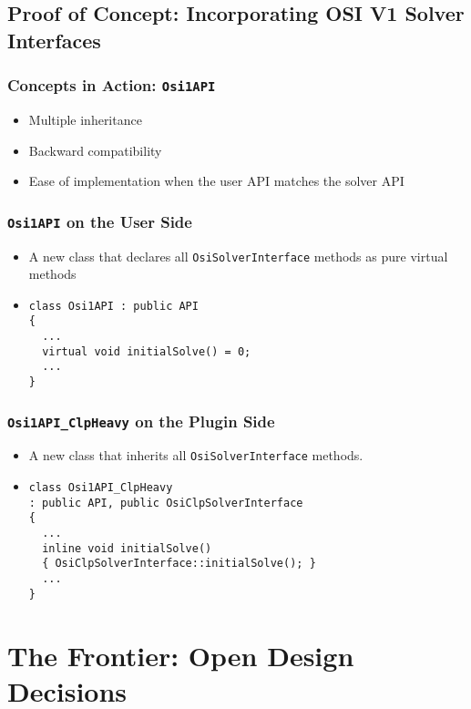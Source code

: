 \documentclass{beamer}
\begin{document}
\subsection{Proof of Concept: Incorporating OSI V1 Solver
  Interfaces}

\begin{frame}
  \frametitle{Concepts in Action: \lstinline|Osi1API|}

  \begin{itemize}
  \item Multiple inheritance
  \item Backward compatibility
  \item Ease of implementation when the user API matches the solver API
  \end{itemize}

\end{frame}

\begin{frame}[fragile]
  \frametitle{\lstinline|Osi1API| on the User Side}

  \begin{itemize}
  \item A new class that declares all \lstinline|OsiSolverInterface|
    methods as pure virtual methods
  \item
\begin{lstlisting}
class Osi1API : public API
{
  ...
  virtual void initialSolve() = 0;
  ...
}
\end{lstlisting}
  \end{itemize}
\end{frame}

\begin{frame}[fragile]
  \frametitle{\lstinline|Osi1API_ClpHeavy| on the Plugin Side}

  \begin{itemize}
  \item A new class that inherits all \lstinline|OsiSolverInterface|
    methods.

  \item
\begin{lstlisting}
class Osi1API_ClpHeavy
: public API, public OsiClpSolverInterface
{
  ...
  inline void initialSolve()
  { OsiClpSolverInterface::initialSolve(); }
  ...
}
\end{lstlisting}
  \end{itemize}
\end{frame}

\section{The Frontier: Open Design Decisions}
\end{document}
